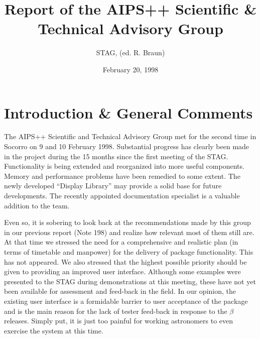 \def\aipspp{AIPS$^{++}$}



\title{Report of the AIPS++ Scientific \& Technical Advisory Group}

\author{STAG, (ed. R. Braun)}

\date{February 20, 1998}

\maketitle


\section{Introduction \& General Comments}

The AIPS++ Scientific and Technical Advisory Group met for the second
time in Socorro on 9 and 10 February 1998. Substantial progress has
clearly been made in the project during the 15 months since the first
meeting of the STAG. Functionality is being extended and reorganized
into more useful components. Memory and performance problems have been
remedied to some extent. The newly developed ``Display Library'' may
provide a solid base for future developments. The recently appointed
documentation specialist is a valuable addition to the team.

Even so, it is sobering to look back at the recommendations made by
this group in our previous report (Note 198) and realize how relevant
most of them still are. At that time we stressed the need for a
comprehensive and realistic plan (in terms of timetable and manpower)
for the delivery of package functionality. This has not appeared. We
also stressed that the highest possible priority should be given to
providing an improved user interface. Although some examples were
presented to the STAG during demonstrations at this meeting, these
have not yet been available for assessment and feed-back in the field.
In our opinion, the existing user interface is a formidable barrier to
user acceptance of the package and is the main reason for the lack of
tester feed-back in response to the $\beta$ releases. Simply put, it is
just too painful for working astronomers to even exercise the system
at this time.


